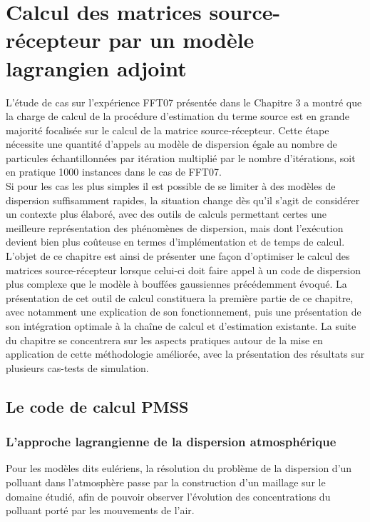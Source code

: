 \chapter{Calcul des matrices source-récepteur par un modèle lagrangien adjoint}

L'étude de cas sur l'expérience FFT07 présentée dans le Chapitre 3 a montré que la charge de calcul de la procédure d'estimation du terme source est en grande majorité focalisée sur le calcul de la matrice source-récepteur. Cette étape nécessite une quantité d'appels au modèle de dispersion égale au nombre de particules échantillonnées par itération multiplié par le nombre d'itérations, soit en pratique 1000 instances dans le cas de FFT07. \\

Si pour les cas les plus simples il est possible de se limiter à des modèles de dispersion suffisamment rapides, la situation change dès qu'il s'agit de considérer un contexte plus élaboré, avec des outils de calculs permettant certes une meilleure représentation des phénomènes de dispersion, mais dont l'exécution devient bien plus coûteuse en termes d'implémentation et de temps de calcul. \\

L'objet de ce chapitre est ainsi de présenter une façon d'optimiser le calcul des matrices source-récepteur lorsque celui-ci doit faire appel à un code de dispersion plus complexe que le modèle à bouffées gaussiennes précédemment évoqué. La présentation de cet outil de calcul constituera la première partie de ce chapitre, avec notamment une explication de son fonctionnement, puis une présentation de son intégration optimale à la chaîne de calcul et d'estimation existante. La suite du chapitre se concentrera sur les aspects pratiques autour de la mise en application de cette méthodologie améliorée, avec la présentation des résultats sur plusieurs cas-tests de simulation.


\section{Le code de calcul PMSS}

\subsection{L'approche lagrangienne de la dispersion atmosphérique}
\label{part_lagrangian}

Pour les modèles dits eulériens, la résolution du problème de la dispersion d'un polluant dans l'atmosphère passe par la construction d'un maillage sur le domaine étudié, afin de pouvoir observer l'évolution des concentrations du polluant porté par les mouvements de l'air. 

